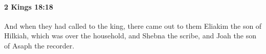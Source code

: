 
		\paragraph{2 Kings 18:18} %
			\label{2KINGS-18-18}

			And when they had called to the king, there came out to them Eliakim the son of Hilkiah, which was over the household, and Shebna the scribe, and Joah the son of Asaph the recorder.


